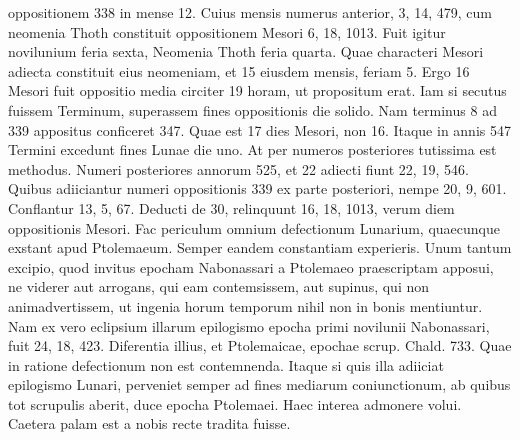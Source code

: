 oppositionem 338 in mense 12.
Cuius mensis numerus anterior, 3, 14,
479, cum neomenia Thoth constituit oppositionem Mesori 6, 18,
1013.
Fuit igitur novilunium feria sexta, Neomenia Thoth feria quarta.
Quae characteri Mesori adiecta constituit eius neomeniam, et 15
eiusdem mensis, feriam 5.
Ergo 16 Mesori fuit oppositio media circiter
19 horam, ut propositum erat.
Iam si secutus fuissem Terminum, superassem
fines oppositionis die solido.
Nam terminus 8 ad 339 appositus
conficeret 347.
Quae est 17 dies Mesori, non 16.
Itaque in annis 547
Termini excedunt fines Lunae die uno.
At per numeros posteriores
tutissima est methodus.
%
Numeri posteriores annorum 525, et 22 adiecti
fiunt 22, 19, 546.
Quibus adiiciantur numeri oppositionis 339
ex parte posteriori, nempe 20, 9, 601.
Conflantur 13, 5, 67.
Deducti
de 30, relinquunt 16, 18, 1013, verum diem oppositionis Mesori.
Fac periculum omnium defectionum Lunarium, quaecunque exstant
apud Ptolemaeum.
Semper eandem constantiam experieris.
Unum
tantum excipio, quod invitus epocham Nabonassari a Ptolemaeo praescriptam
apposui, ne viderer aut arrogans, qui eam contemsissem,
aut supinus, qui non animadvertissem, ut ingenia horum temporum
nihil non in bonis mentiuntur.
Nam ex vero eclipsium illarum
epilogismo epocha primi novilunii Nabonassari, fuit 24, 18, 423.
Diferentia illius, et Ptolemaicae, epochae scrup. %
Chald. %
733. %
Quae in ratione
defectionum non est contemnenda.
Itaque si quis illa adiiciat
epilogismo Lunari, perveniet semper ad fines mediarum coniunctionum,
ab %
 quibus tot scrupulis aberit, duce epocha Ptolemaei.
Haec
interea admonere volui.
Caetera palam est a nobis recte tradita fuisse.
%
